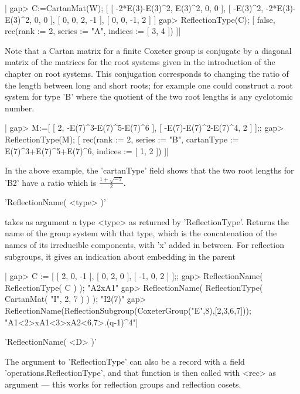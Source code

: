 |    gap> C:=CartanMat(W);
    [ [ -2*E(3)-E(3)^2, E(3)^2, 0, 0 ], [ -E(3)^2, -2*E(3)-E(3)^2, 0, 0 ],
      [ 0, 0, 2, -1 ], [ 0, 0, -1, 2 ] ]
    gap> ReflectionType(C);
    [ false, rec(rank    := 2,
          series  := "A",
          indices := [ 3, 4 ]) ]|

Note  that a  Cartan matrix  for a  finite Coxeter  group is conjugate by a
diagonal  matrix  of  the  matrices  for  the  root  systems  given  in the
introduction  of the chapter on  root systems. This conjugation corresponds
to  changing the  ratio of  the length  between long  and short  roots; for
example  one could construct a root system  for type 'B' where the quotient
of the two root lengths is any cyclotomic number.

|    gap> M:=[ [ 2, -E(7)^3-E(7)^5-E(7)^6 ], [ -E(7)-E(7)^2-E(7)^4, 2 ] ];;
    gap> ReflectionType(M);
    [ rec(rank       := 2,
          series     := "B",
          cartanType := E(7)^3+E(7)^5+E(7)^6,
          indices    := [ 1, 2 ]) ]|

In  the  above  example,  the  'cartanType'  field  shows that the two root
lengths for 'B2' have a ratio which is $\frac{1+\sqrt{-7}}{2}$.


'ReflectionName( <type> )'

takes  as argument a  type <type> as  returned by 'ReflectionType'. Returns
the  name of the group system with  that type, which is the concatenation of
the names of its irreducible components, with 'x' added in between. For
reflection subgroups, it gives an indication about embedding in the parent

|    gap> C := [ [ 2, 0, -1 ], [ 0, 2, 0 ], [ -1, 0, 2 ] ];;
    gap> ReflectionName( ReflectionType( C ) );
    "A2xA1"
    gap> ReflectionName( ReflectionType( CartanMat( "I", 2, 7 ) ) );
    "I2(7)"
    gap> ReflectionName(ReflectionSubgroup(CoxeterGroup("E",8),[2,3,6,7]));
    "A1<2>xA1<3>xA2<6,7>.(q-1)^4"|

'ReflectionName( <D> )'

The  argument  to  'ReflectionType'  can  also  be  a  record  with a field
'operations.ReflectionType', and that function is then called with <rec> as
argument --- this works for reflection groups and reflection cosets.


